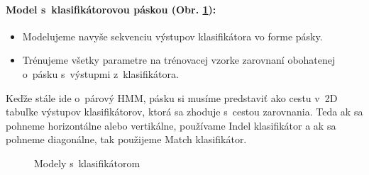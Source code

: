 \documentclass[myposter,portrait]{sciposter}
\begin{document}
\begin{multicols*}{3}
\paragraph{Model s~klasifikátorovou páskou (Obr. \ref{fig:model-clf-tape}):}

\begin{itemize}
    \item Modelujeme navyše sekvenciu výstupov klasifikátora vo forme pásky.
    \item Trénujeme všetky parametre na trénovacej vzorke zarovnaní obohatenej o~pásku s~výstupmi z~klasifikátora.
\end{itemize}

Keďže stále ide o~párový HMM, pásku si musíme predstaviť ako cestu v~2D tabuľke výstupov klasifikátorov, ktorá sa zhoduje s~cestou zarovnania. Teda ak sa pohneme horizontálne  alebo vertikálne, používame Indel klasifikátor a ak sa pohneme diagonálne, tak použijeme Match klasifikátor.

\begin{figure}
    \centering
    \label{fig:faeture-importances}
    \label{fig:model-clf}
    \label{fig:model-clf-tape}
    \caption{Modely s~klasifikátorom}
\end{figure}


\end{multicols*}
\end{document}
